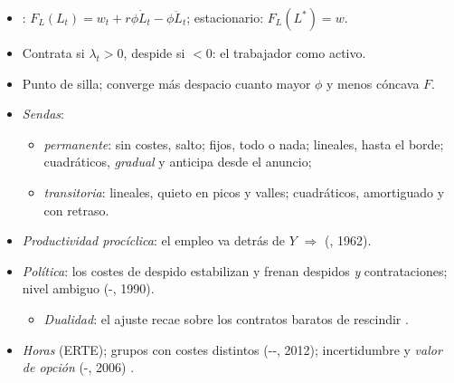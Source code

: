 \documentclass{article}
\begin{document}
\begin{columnas}
\begin{itemize}
  \begin{itemize}
  \item {}: $F_L(L_t)=w_t+r\phi\dot L_t-\phi\ddot L_t$; estacionario: $F_L(L^*)=w$.
  \item Contrata si $\lambda_t>0$, despide si $<0$: el trabajador como activo.
  \item Punto de silla; converge más despacio cuanto mayor $\phi$ y menos cóncava $F$.
  \end{itemize}
\end{itemize}
\begin{itemize}
\item \emph{Sendas}:
  \begin{itemize}
  \item \emph{permanente}: sin costes, salto; fijos, todo o nada; lineales, hasta el borde; cuadráticos, \emph{gradual} y anticipa desde el anuncio;
  \item \emph{transitoria}: lineales, quieto en picos y valles; cuadráticos, amortiguado y con retraso.
  \end{itemize}
\end{itemize}
\begin{itemize}
\item \emph{Productividad procíclica}: el empleo va detrás de $Y$ $\Rightarrow$  (, 1962).
\item \emph{Política}: los costes de despido estabilizan y frenan despidos \emph{y} contrataciones; nivel ambiguo (-, 1990).
  \begin{itemize}
  \item \emph{Dualidad}: el ajuste recae sobre los contratos baratos de rescindir .
  \end{itemize}
\end{itemize}

\begin{itemize}
\item \emph{Horas} (ERTE); grupos con costes distintos (--, 2012); incertidumbre y \emph{valor de opción} (-, 2006) .
\end{itemize}


\end{columnas}
\end{document}
